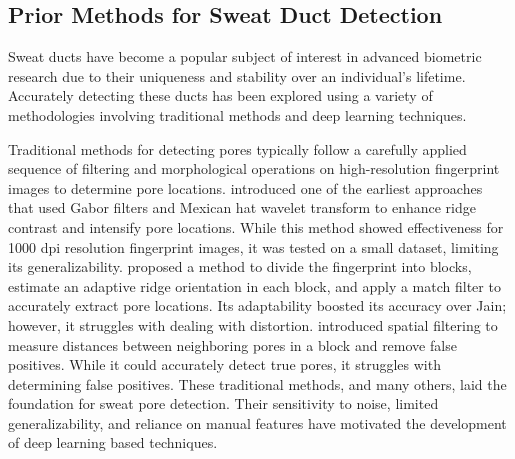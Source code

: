 \subsection{Prior Methods for Sweat Duct Detection}

Sweat ducts have become a popular subject of interest in advanced biometric research due to their uniqueness and stability over an individual's lifetime. Accurately detecting these ducts has been explored using a variety of methodologies involving traditional methods and deep learning techniques.

Traditional methods for detecting pores typically follow a carefully applied sequence of filtering and morphological operations on high-resolution fingerprint images to determine pore locations. \textcite{jainPoresRidgesHighResolution2007} introduced one of the earliest approaches that used Gabor filters and Mexican hat wavelet transform to enhance ridge contrast and intensify pore locations. While this method showed effectiveness for 1000 dpi resolution fingerprint images, it was tested on a small dataset, limiting its generalizability. \textcite{zhaoAdaptiveFingerprintPore2010} proposed a method to divide the fingerprint into blocks, estimate an adaptive ridge orientation in each block, and apply a match filter to accurately extract pore locations. Its adaptability boosted its accuracy over Jain; however, it struggles with dealing with distortion. \textcite{teixeiraImprovingPoreExtraction2014} introduced spatial filtering to measure distances between neighboring pores in a block and remove false positives. While it could accurately detect true pores, it struggles with determining false positives. These traditional methods, and many others, laid the foundation for sweat pore detection. Their sensitivity to noise, limited generalizability, and reliance on manual features have motivated the development of deep learning based techniques.

